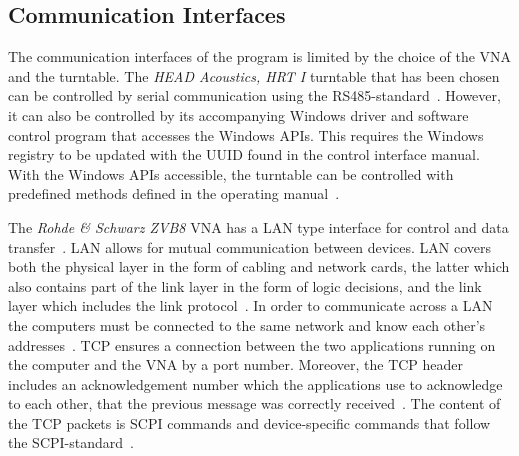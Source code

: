 \subsection{Communication Interfaces} \label{ss:com_interface}
The communication interfaces of the program is limited by the choice of the VNA and the turntable. The \textit{HEAD Acoustics, HRT I} turntable that has been chosen can be controlled by serial communication using the RS485-standard~\cite{hrt_i_data_sheet}. However, it can also be controlled by its accompanying Windows driver and software control program that accesses the Windows APIs. This requires the Windows registry to be updated with the UUID found in the control interface manual. With the Windows APIs accessible, the turntable can be controlled with predefined methods defined in the operating manual~\cite{hrt_control_api_manual}. 

The \textit{Rohde \& Schwarz ZVB8} VNA has a LAN type interface for control and data transfer~\cite[p. 5.3]{vna_data_sheet_spec}. LAN allows for mutual communication between devices. LAN covers both the physical layer in the form of cabling and network cards, the latter which also contains part of the link layer in the form of logic decisions, and the link layer which includes the link protocol~\cite[p. 153]{tcp_ip}. In order to communicate across a LAN the computers must be connected to the same network and know each other's addresses~\cite[p. 174-175]{tcp_ip}. TCP ensures a connection between the two applications running on the computer and the VNA by a port number. Moreover, the TCP header includes an acknowledgement number which the applications use to acknowledge to each other, that the previous message was correctly received~\cite[p. 313]{tcp_ip}. The content of the TCP packets is SCPI commands and device-specific commands that follow the SCPI-standard~\cite[p. 5.4]{vna_data_sheet_spec}.



